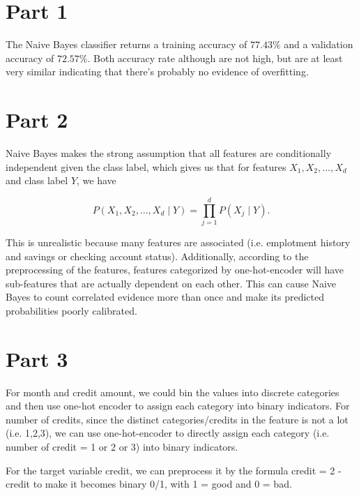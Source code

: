 \documentclass[12pt,letterpaper]{article}
\begin{document}
\section*{Part 1}

The Naive Bayes classifier returns a training accuracy of $77.43\%$ and a validation accuracy of $72.57\%$. Both accuracy rate although are not high, but are at least very similar indicating that there's probably no evidence of overfitting.


\section*{Part 2}

Naive Bayes makes the strong assumption that all features are conditionally independent given the class label, which gives us that for features $X_1, X_2, \ldots, X_d$ and class label $Y$,
we have

\[
P(X_1,X_2,\ldots,X_d \mid Y)=\prod_{j=1}^{d}P(X_j\mid Y).
\]

This is unrealistic because many features are associated (i.e. emplotment history and savings or checking account status). Additionally, according to the preprocessing of the features, features categorized by one-hot-encoder will have sub-features that are actually dependent on each other. This can cause Naive Bayes to count correlated evidence more than once and make its predicted probabilities poorly calibrated.


\section*{Part 3}

For month and credit amount, we could bin the values into discrete categories and then use one-hot encoder to assign each category into binary indicators. For number of credits, since the distinct categories/credits in the feature is not a lot (i.e. 1,2,3), we can use one-hot-encoder to directly assign each category (i.e. number of credit = 1 or 2 or 3) into binary indicators.

For the target variable credit, we can preprocess it by the formula credit = 2 - credit to make it becomes binary 0/1, with 1 = good and 0 = bad.
\end{document}

